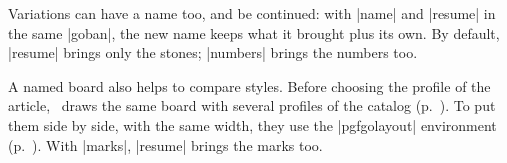 \begin{goban}
\begin{codeexample}[]

	\begin{goban}[name = base]
	\end{goban}

	\begin{goban}[resume = base]
	\end{goban}

	\begin{goban}[resume = base]
	\end{goban}
\end{codeexample}

Variations can have a name too, and be continued: with |name| and |resume| in the same |goban|, the new name keeps what it brought plus its own. By default, |resume| brings only the stones; |numbers| brings the numbers too.

\begin{codeexample}[]

	\begin{goban}[name = base]
	\end{goban}

	\begin{goban}[name = variation, resume = base]
	\end{goban}

	\begin{goban}[resume = {variation, numbers}]
	\end{goban}
\end{codeexample}

A named board also helps to compare styles. Before choosing the profile of the article, \karu\ draws the same board with several profiles of the catalog (p.~\pageref{sec:catalogo}). To put them side by side, with the same width, they use the |pgfgolayout| environment (p.~\pageref{subsec:disposicion}). With |marks|, |resume| brings the marks too.

\begin{codeexample}
	\begin{goban}[5, name = styles]
	\end{goban}


\end{codeexample}
\end{goban}
